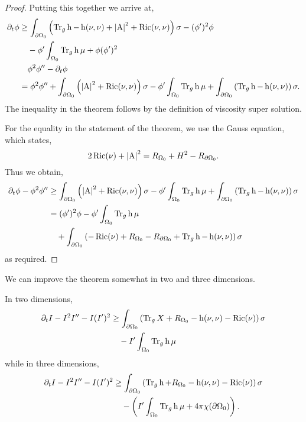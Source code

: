 \documentclass{amsart}
\begin{document}
\begin{proof}
Putting this together we arrive at,
\[
\begin{split}
\partial_t \phi &\geq \int_{\partial {\Omega_0}} \left(\operatorname{Tr}_g \operatorname{h} - \operatorname{h}(\nu, \nu) + \left|{\operatorname{A}}\right|^2 + \operatorname{Ric}(\nu, \nu) \right)\sigma - (\phi')^2 \phi \\
&\quad - \phi'\int_{\Omega_0} \operatorname{Tr}_g \operatorname{h} \mu + \phi (\phi')^2 \\
&\quad \phi^2 \phi'' -\partial_t \phi \\
&= \phi^2 \phi'' + \int_{\partial {\Omega_0}} \left(\left|{\operatorname{A}}\right|^2 + \operatorname{Ric}(\nu, \nu)\right) \sigma - \phi'\int_{\Omega_0} \operatorname{Tr}_g \operatorname{h} \mu + \int_{\partial {\Omega_0}} \left(\operatorname{Tr}_g \operatorname{h} - \operatorname{h}(\nu, \nu)\right) \sigma.
\end{split}
\]
The inequality in the theorem follows by the definition of viscosity super solution.

For the equality in the statement of the theorem, we use the Gauss equation, which states,
\[
2 \operatorname{Ric}(\nu) + \left|{\operatorname{A}}\right|^2 = R_{\Omega_0} + H^2 - R_{\partial {\Omega_0}}.
\]
Thus we obtain,
\[
\begin{split}
\partial_t \phi - \phi^2 \phi'' &\geq \int_{\partial {\Omega_0}} \left(\left|{\operatorname{A}}\right|^2 + \operatorname{Ric}(\nu, \nu)\right) \sigma  - \phi'\int_{\Omega_0} \operatorname{Tr}_g \operatorname{h} \mu + \int_{\partial {\Omega_0}} \left(\operatorname{Tr}_g \operatorname{h} - \operatorname{h}(\nu, \nu)\right) \sigma \\
&= (\phi')^2 \phi - \phi'\int_{\Omega_0} \operatorname{Tr}_g \operatorname{h} \mu \\
&\quad + \int_{\partial {\Omega_0}} \left(-\operatorname{Ric}(\nu) + R_{\Omega_0} - R_{\partial {\Omega_0}} + \operatorname{Tr}_g \operatorname{h} - \operatorname{h}(\nu, \nu)\right) \sigma
\end{split}
\]
as required.
\end{proof}

We can improve the theorem somewhat in two and three dimensions.

\begin{cor}
\label{cor:low_dim_general_viscosity}
In two dimensions,
\[
\begin{split}
\partial_t I - I^2 I'' - I(I')^2 &\geq \int_{\partial {\Omega_0}} \left(\operatorname{Tr}_g X + R_{\Omega_0} - \operatorname{h}(\nu, \nu) - \operatorname{Ric}(\nu)\right)\sigma \\
&\quad - I'\int_{\Omega_0} \operatorname{Tr}_g \operatorname{h} \mu
\end{split}
\]
while in three dimensions,
\[
\begin{split}
\partial_t I - I^2 I'' - I(I')^2 &\geq \int_{\partial {\Omega_0}} \left(\operatorname{Tr}_g \operatorname{h} + R_{\Omega_0} - \operatorname{h}(\nu, \nu) - \operatorname{Ric}(\nu)\right)\sigma \\
&\quad - \left(I'\int_{\Omega_0} \operatorname{Tr}_g \operatorname{h} \mu +  4\pi \chi(\partial {\Omega_0})\right).
\end{split}
\]
\end{cor}
\end{document}
